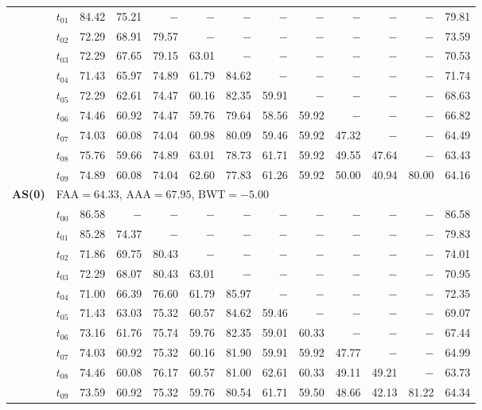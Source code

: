 \begin{table}[ht]
\begin{tabular}{@{}l l r r r r r r r r r r r@{}}
 & $t_{01}$ & 84.42 & 75.21 & $-$ & $-$ & $-$ & $-$ & $-$ & $-$ & $-$ & $-$ & 79.81 \\
 & $t_{02}$ & 72.29 & 68.91 & 79.57 & $-$ & $-$ & $-$ & $-$ & $-$ & $-$ & $-$ & 73.59 \\
 & $t_{03}$ & 72.29 & 67.65 & 79.15 & 63.01 & $-$ & $-$ & $-$ & $-$ & $-$ & $-$ & 70.53 \\
 & $t_{04}$ & 71.43 & 65.97 & 74.89 & 61.79 & 84.62 & $-$ & $-$ & $-$ & $-$ & $-$ & 71.74 \\
 & $t_{05}$ & 72.29 & 62.61 & 74.47 & 60.16 & 82.35 & 59.91 & $-$ & $-$ & $-$ & $-$ & 68.63 \\
 & $t_{06}$ & 74.46 & 60.92 & 74.47 & 59.76 & 79.64 & 58.56 & 59.92 & $-$ & $-$ & $-$ & 66.82 \\
 & $t_{07}$ & 74.03 & 60.08 & 74.04 & 60.98 & 80.09 & 59.46 & 59.92 & 47.32 & $-$ & $-$ & 64.49 \\
 & $t_{08}$ & 75.76 & 59.66 & 74.89 & 63.01 & 78.73 & 61.71 & 59.92 & 49.55 & 47.64 & $-$ & 63.43 \\
 & $t_{09}$ & 74.89 & 60.08 & 74.04 & 62.60 & 77.83 & 61.26 & 59.92 & 50.00 & 40.94 & 80.00 & 64.16 \\
\midrule
\multirow{11}{*}{\textbf{AS(0)}} & \multicolumn{12}{l}{\quad\small FAA$=64.33$,\; AAA$=67.95$,\; BWT$=-5.00$} \\
 & $t_{00}$ & 86.58 & $-$ & $-$ & $-$ & $-$ & $-$ & $-$ & $-$ & $-$ & $-$ & 86.58 \\
 & $t_{01}$ & 85.28 & 74.37 & $-$ & $-$ & $-$ & $-$ & $-$ & $-$ & $-$ & $-$ & 79.83 \\
 & $t_{02}$ & 71.86 & 69.75 & 80.43 & $-$ & $-$ & $-$ & $-$ & $-$ & $-$ & $-$ & 74.01 \\
 & $t_{03}$ & 72.29 & 68.07 & 80.43 & 63.01 & $-$ & $-$ & $-$ & $-$ & $-$ & $-$ & 70.95 \\
 & $t_{04}$ & 71.00 & 66.39 & 76.60 & 61.79 & 85.97 & $-$ & $-$ & $-$ & $-$ & $-$ & 72.35 \\
 & $t_{05}$ & 71.43 & 63.03 & 75.32 & 60.57 & 84.62 & 59.46 & $-$ & $-$ & $-$ & $-$ & 69.07 \\
 & $t_{06}$ & 73.16 & 61.76 & 75.74 & 59.76 & 82.35 & 59.01 & 60.33 & $-$ & $-$ & $-$ & 67.44 \\
 & $t_{07}$ & 74.03 & 60.92 & 75.32 & 60.16 & 81.90 & 59.91 & 59.92 & 47.77 & $-$ & $-$ & 64.99 \\
 & $t_{08}$ & 74.46 & 60.08 & 76.17 & 60.57 & 81.00 & 62.61 & 60.33 & 49.11 & 49.21 & $-$ & 63.73 \\
 & $t_{09}$ & 73.59 & 60.92 & 75.32 & 59.76 & 80.54 & 61.71 & 59.50 & 48.66 & 42.13 & 81.22 & 64.34 \\

\end{tabular}
\end{table}
